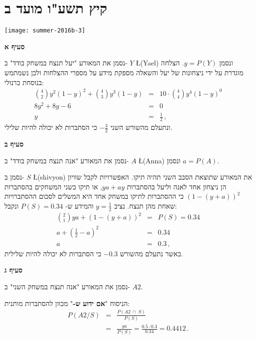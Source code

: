 

\section{קיץ תשע"ו מועד ב}

\begin{center}
\texttt{[image: summer-2016b-3]}
\end{center}

\textbf{סעיף א}

נסמן את המאורע "יעל תנצח במשחק בודד" ב-%
$Y$ \L{(Yael)}
ונסמן
$y=P(Y)$.
הצלחה מוגדרת על ידי ניצחונות של יעל והשאלה מספקת מידע על מספרי ההצלחות ולכן נשמתמש בנוסחת ברנולי:
\begin{eqnarray*}
{4 \choose 2}y^2(1-y)^2 + {4\choose 3}y^3(1-y) &=& 10\cdot {4\choose 4}y^4(1-y)^0\\
8y^2+8y-6&=&0\\
y&=&\frac{1}{2}\,,
\end{eqnarray*}
ונתעלם מהשורש השני 
$-\frac{3}{2}$
כי הסתברות לא יכולה להיות שלילי.

\textbf{סעיף ב}

נסמן את המאורע "אנה תנצח במשחק בודד" ב-%
$A$ \L{(Anna)}
ונסמן
$a=P(A)$.

נסמן ב-%
$S$ \L{(shivyon)}
את המאורע שתוצאת הסבב השני תהיה תיקו. האפשרויות לקבל שוויון הן ניצחון אחד לאנה וליעל בהסתברות 
$ya+ay$,
או תיקו בשני המשחקים בהסתברות
$(1-(y+a))^2$
כי ההסתברות לתיקו במשחק אחד היא המשלים לסכום ההסתברויות שאחת מהן תנצח. נציב
$y=\frac{1}{2}$
והמידע ש-%
$P(S)=0.34$
ונקבל:
\begin{eqnarray*}
{2 \choose 1}ya + (1-(y+a))^2 &=&P(S)= 0.34\\
a + (\textstyle\frac{1}{2}-a)^2&=&0.34\\
a&=&0.3\,,
\end{eqnarray*}
כאשר נתעלם מהשורש
$-0.3$
כי הסתברות לא יכולה להיות שלילית.

\textbf{סעיף ג}

נסמן את המאורע "אנה תנצח במשחק השני" ב-%
$A2$.

הניסוח
"\textbf{אם ידוע ש-}"
מכוון להסתברות מותנית:
\begin{eqnarray*}
P(A2/S) &=& \frac{P(A2\:\cap\;S)}{P(S)}\\
&=&\frac{ya}{P(S)}=\frac{0.5\cdot 0.3}{0.34}=0.4412\,.
\end{eqnarray*}

